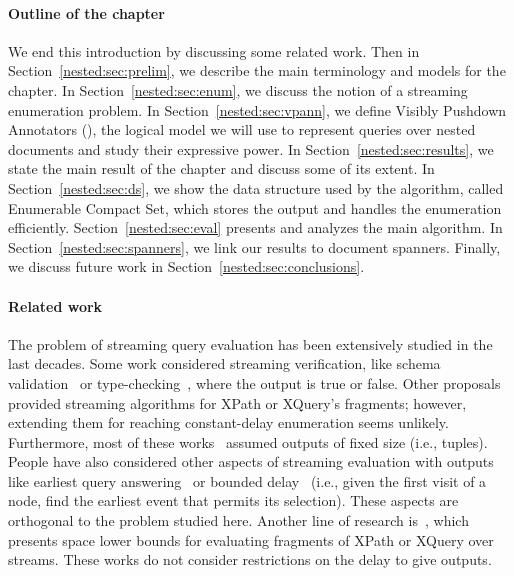 
\paragraph{Outline of the chapter} We end this introduction by discussing some related work. 
Then in Section~\ref{nested:sec:prelim}, we describe the main terminology and models for the chapter. 
In Section~\ref{nested:sec:enum}, we discuss the notion of a streaming enumeration problem. 
In Section~\ref{nested:sec:vpann}, we define Visibly Pushdown Annotators (\vpann), the logical model we will use to represent queries over nested documents and study their expressive power. In Section~\ref{nested:sec:results}, we state the main result of the chapter and discuss some of its extent. In Section~\ref{nested:sec:ds}, we show the data structure used by the algorithm, called Enumerable Compact Set, which stores the output and handles the enumeration efficiently. Section~\ref{nested:sec:eval} presents and analyzes the main algorithm. In Section~\ref{nested:sec:spanners}, we link our results to document spanners. Finally, we discuss future work in Section~\ref{nested:sec:conclusions}. 

\paragraph{Related work} The problem of streaming query evaluation has been extensively studied in the last decades. Some work considered streaming verification, like schema validation~\cite{SegoufinV02} or type-checking~\cite{KumarMV07}, where the output is true or false. Other proposals~\cite{ChenDZ06,OlteanuFB04,JosifovskiFB05,GreenGMOS04,Olteanu07} provided streaming algorithms for XPath or XQuery's fragments; however, extending them for reaching constant-delay enumeration seems unlikely. Furthermore, most of these works~\cite{KumarMV07,GouC07,GauwinNT09} assumed outputs of fixed size (i.e., tuples). People have also considered other aspects of streaming evaluation with outputs like earliest query answering~\cite{GauwinNT09} or bounded delay~\cite{DBLP:conf/lata/GauwinNT09} (i.e., given the first visit of a node, find the earliest event that permits its selection). These aspects are orthogonal to the problem studied here.
Another line of research is~\cite{BarYossefFJ05,BarYossefFJ07}, which presents space lower bounds for evaluating fragments of XPath or XQuery over streams. These works do not consider restrictions on the delay to give outputs.  

